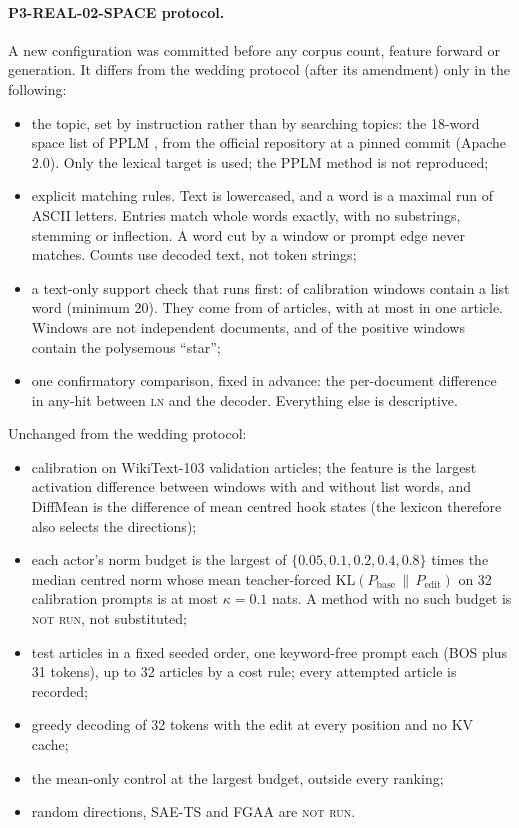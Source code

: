 \documentclass{article}
\theoremstyle{plain}
\theoremstyle{definition}
\theoremstyle{remark}
\newcommand{\notrun}{\textsc{not run}}
\newcommand{\LN}{\textsc{ln}}
\begin{document}
\paragraph{P3-REAL-02-SPACE protocol.} A new configuration was committed before any corpus
count, feature forward or generation. It differs from the wedding protocol (after its
amendment) only in the following:
\begin{itemize}
  \item the topic, set by instruction rather than by searching topics: the 18-word space list
  of PPLM \citep{dathathri2020plug}, from the official repository at a pinned commit (Apache
  2.0). Only the lexical target is used; the PPLM method is not reproduced;
  \item explicit matching rules. Text is lowercased, and a word is a maximal run of ASCII
  letters. Entries match whole words exactly, with no substrings, stemming or inflection. A
  word cut by a window or prompt edge never matches. Counts use decoded text, not token
  strings;
  \item a text-only support check that runs first: \SpPosWin{} of \SpWin{} calibration windows
  contain a list word (minimum 20). They come from \SpPosDocs{} of \SpCalDocs{} articles,
  with at most \SpMaxDoc{} in one article. Windows are not independent documents, and
  \SpStarWin{} of the positive windows contain the polysemous ``star'';
  \item one confirmatory comparison, fixed in advance: the per-document difference in
  any-hit between \LN{} and the decoder. Everything else is descriptive.
\end{itemize}
Unchanged from the wedding protocol:
\begin{itemize}
  \item calibration on WikiText-103 validation articles; the feature is the largest
  activation difference between windows with and without list words, and DiffMean is the
  difference of mean centred hook states (the lexicon therefore also selects the
  directions);
  \item each actor's norm budget is the largest of $\{0.05, 0.1, 0.2, 0.4, 0.8\}$ times the
  median centred norm whose mean teacher-forced KL$(P_{\mathrm{base}}\,\|\,P_{\mathrm{edit}})$
  on 32 calibration prompts is at most $\kappa = 0.1$ nats. A method with no such budget is
  \notrun, not substituted;
  \item test articles in a fixed seeded order, one keyword-free prompt each (BOS plus 31
  tokens), up to 32 articles by a cost rule; every attempted article is recorded;
  \item greedy decoding of 32 tokens with the edit at every position and no KV cache;
  \item the mean-only control at the largest budget, outside every ranking;
  \item random directions, SAE-TS and FGAA are \notrun.
\end{itemize}
\end{document}
